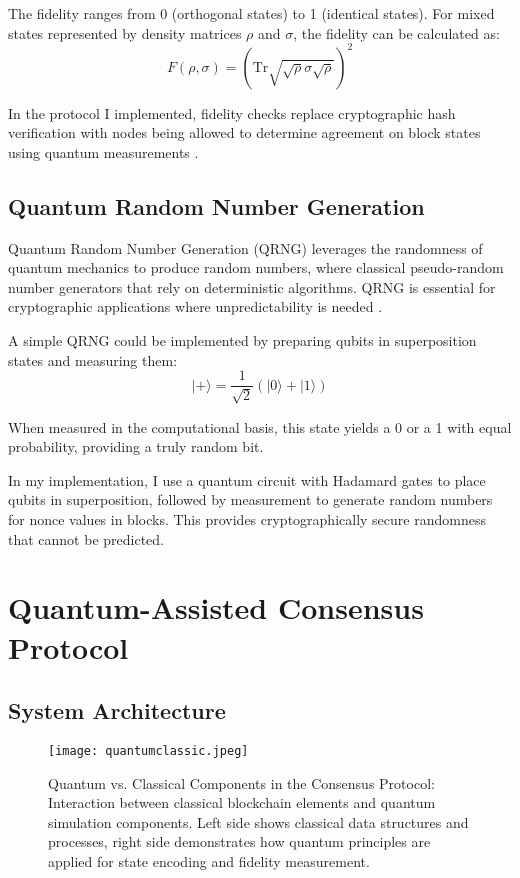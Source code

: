 \documentclass[11pt,a4paper]{article}
\begin{document}
The fidelity ranges from 0 (orthogonal states) to 1 (identical states). For mixed states represented by density matrices $\rho$ and $\sigma$, the fidelity can be calculated as:
\begin{equation}
F(\rho, \sigma) = \left(\text{Tr}\sqrt{\sqrt{\rho}\sigma\sqrt{\rho}}\right)^2
\end{equation}

In the protocol I implemented, fidelity checks replace cryptographic hash verification with nodes being allowed to determine agreement on block states using quantum measurements \cite{wikipedia_fidelity, entangled_physics}.

\subsection{Quantum Random Number Generation}
Quantum Random Number Generation (QRNG) leverages the randomness of quantum mechanics to produce random numbers, where classical pseudo-random number generators that rely on deterministic algorithms. QRNG is essential for cryptographic applications where unpredictability is needed \cite{id_quantique_qrng, nature_qrng}.

A simple QRNG could be implemented by preparing qubits in superposition states and measuring them:
\begin{equation}
|+\rangle = \frac{1}{\sqrt{2}}(|0\rangle + |1\rangle)
\end{equation}

When measured in the computational basis, this state yields a 0 or a 1 with equal probability, providing a truly random bit.

In my implementation, I use a quantum circuit with Hadamard gates to place qubits in superposition, followed by measurement to generate random numbers for nonce values in blocks. This provides cryptographically secure randomness that cannot be predicted.

\section{Quantum-Assisted Consensus Protocol}

\subsection{System Architecture}

\begin{figure}[ht]
  \centering
  \texttt{[image: quantumclassic.jpeg]}
  \caption{Quantum vs. Classical Components in the Consensus Protocol: Interaction between classical blockchain elements and quantum simulation components. Left side shows classical data structures and processes, right side demonstrates how quantum principles are applied for state encoding and fidelity measurement.}
  \label{fig:quantumclassical}
\end{figure}
\end{document}
